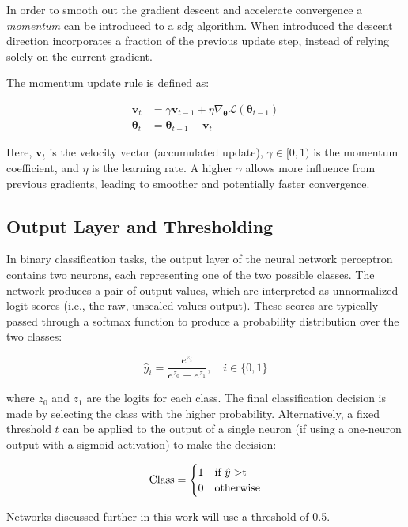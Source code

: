 \documentclass{pracalicmgr}
\begin{document}
In order to smooth out the gradient descent and accelerate convergence a \textit{momentum} can be introduced to a sdg algorithm. When introduced the descent direction incorporates a fraction of the previous update step, instead of relying solely on the current gradient.

The momentum update rule is defined as:

\[
\begin{aligned}
\mathbf{v}_t &= \gamma \mathbf{v}_{t-1} + \eta \nabla_{\boldsymbol{\theta}} \mathcal{L}(\boldsymbol{\theta}_{t-1}) \\
\boldsymbol{\theta}_t &= \boldsymbol{\theta}_{t-1} - \mathbf{v}_t
\end{aligned}
\]

Here, \( \mathbf{v}_t \) is the velocity vector (accumulated update), \( \gamma \in [0,1) \) is the momentum coefficient, and \( \eta \) is the learning rate. A higher \( \gamma \) allows more influence from previous gradients, leading to smoother and potentially faster convergence.

\subsection{Output Layer and Thresholding}

In binary classification tasks, the output layer of the neural network perceptron contains two neurons, each representing one of the two possible classes. The network produces a pair of output values, which are interpreted as unnormalized logit scores (i.e., the raw, unscaled values output). These scores are typically passed through a softmax function to produce a probability distribution over the two classes:

\[
\hat{y}_i = \frac{e^{z_i}}{e^{z_0} + e^{z_1}}, \quad i \in \{0, 1\}
\]

where \( z_0 \) and \( z_1 \) are the logits for each class. The final classification decision is made by selecting the class with the higher probability. Alternatively, a fixed threshold $t$ can be applied to the output of a single neuron (if using a one-neuron output with a sigmoid activation) to make the decision:

\[
\text{Class} = 
\begin{cases}
1 & \text{if } \hat{y} > $t$ \\
0 & \text{otherwise}
\end{cases}
\]

Networks discussed further in this work will use a threshold of 0.5.
\end{document}

